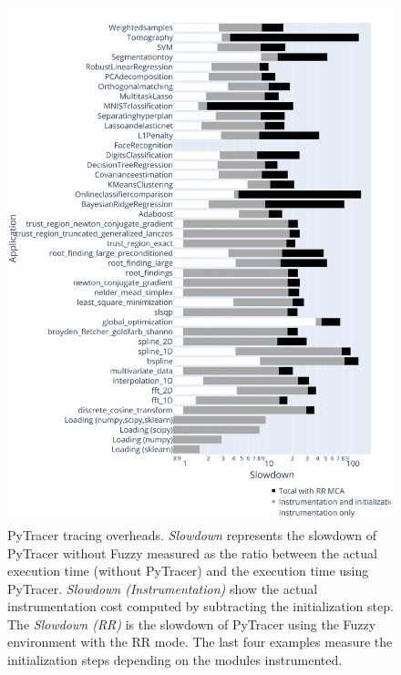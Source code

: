 \documentclass[10pt,journal,compsoc]{IEEEtran}
\newcommand{\pytracer}[0]{PyTracer\xspace}
\begin{document}
\begin{figure}
    \centering
    \includegraphics[width=\linewidth]{figure/performance.png}
    \caption{
        \pytracer tracing overheads. \textit{Slowdown} represents the slowdown
        of \pytracer without Fuzzy measured as the ratio between the actual
        execution time (without \pytracer) and the execution time using
        \pytracer. \textit{Slowdown (Instrumentation)} show the actual
        instrumentation cost computed by subtracting the initialization step.
        The \textit{Slowdown (RR)} is the slowdown
        of \pytracer using the Fuzzy environment with the RR mode. The
        last four examples measure the initialization
        steps depending on the modules instrumented. 
    }
    \label{fig:performance_tracing}
\end{figure}
\end{document}
